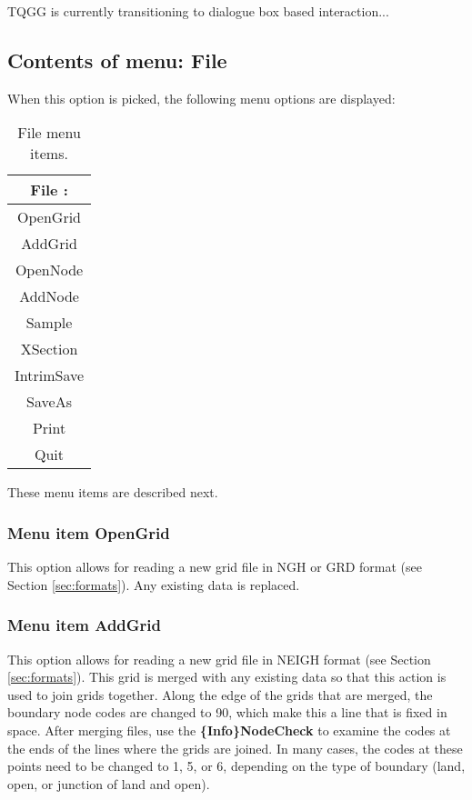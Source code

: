\documentclass{article}
\begin{document}
TQGG is currently transitioning to dialogue box based interaction... 

\subsection{Contents of menu: File}
When this option is picked, the following menu options are displayed:

\begin{table}[htb!]
 \caption{File menu items.}
  \begin{center}
   \begin{tabular}{|c|}
    \hline
File :\\     \hline
OpenGrid \\ AddGrid \\     \hline
OpenNode \\ AddNode \\    \hline
Sample \\    \hline
XSection \\    \hline
IntrimSave \\ SaveAs \\    \hline
Print \\ Quit\\
    \hline
   \end{tabular}
   \label{tab:FILE}
  \end{center}
\end{table}

These menu items are described next.

\subsubsection[Menu item OpenGrid]{Menu item OpenGrid}
This option allows for reading a new grid file in NGH or GRD format (see Section \ref{sec:formats}). Any existing data is replaced.

\subsubsection[Menu item AddGrid]{Menu item AddGrid}
This option allows for reading a new grid file in NEIGH format (see Section \ref{sec:formats}). This grid is merged with any existing data so that this action is used to join grids together. Along the edge of the grids that are merged, the boundary node codes are changed to 90, which make this a line that is fixed in space. After merging files, use the \textbf{\{Info\}NodeCheck} to examine the codes at the ends of the lines where the grids are joined. In many cases, the codes at these points need to be changed to 1, 5, or 6, depending on the type of boundary (land, open, or junction of land and open).
\end{document}
